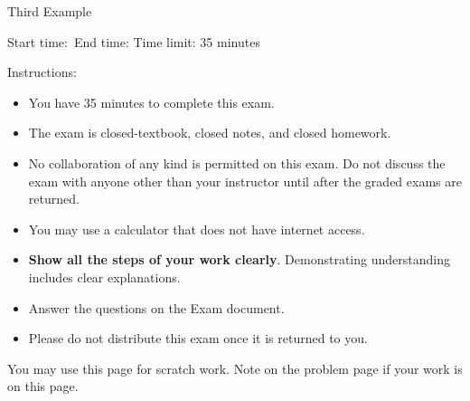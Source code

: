 \documentclass[main.tex,14pt]{subfiles}
\begin{document}
\setcounter{page}{0}
\thispagestyle{empty}

{\Large Third Example}%

{Start time:\hrulefill\ End time: \hrulefill}
Time limit: 35 minutes

\vspace{1cm}
{\Large Instructions:}
\begin{itemize}

 \item You have 35 minutes to complete this exam.

 \item The exam is closed-textbook, closed notes, and closed homework. 
 
 \item No collaboration of any kind is permitted on this exam. Do not discuss the exam with anyone other than your instructor until after the graded exams are returned.
 
 \item You may use a calculator that does not have internet access. 

 \item \textbf{Show all the steps of your work clearly}. Demonstrating understanding includes clear explanations.
 
\item Answer the questions on the Exam document. 


\item Please do not distribute this exam once it is returned to you.



 \end{itemize}


\afterpage{\blankpage}

\clearpage


 \begin{questions}


 \question 

 \question 

 \question 
 
 
\end{questions}

You may use this page for scratch work. Note on the problem page if your work is on this page.
\thispagestyle{empty}
\hbox{}


\checkoddpage{}
\end{document}
